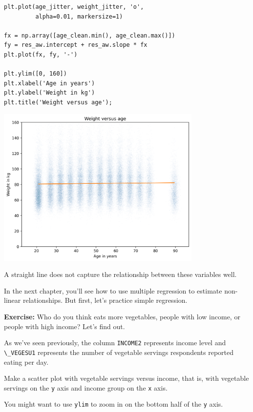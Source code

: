 \begin{lstlisting}[]
plt.plot(age_jitter, weight_jitter, 'o', 
         alpha=0.01, markersize=1)

fx = np.array([age_clean.min(), age_clean.max()])
fy = res_aw.intercept + res_aw.slope * fx
plt.plot(fx, fy, '-')

plt.ylim([0, 160])
plt.xlabel('Age in years')
plt.ylabel('Weight in kg')
plt.title('Weight versus age');
\end{lstlisting}

\begin{center}
\includegraphics[width=4in]{chapters/09_relationships_files/09_relationships_106_0.png}
\end{center}

A straight line does not capture the relationship between these
variables well.

In the next chapter, you'll see how to use multiple regression to
estimate non-linear relationships. But first, let's practice simple
regression.

\textbf{Exercise:} Who do you think eats more vegetables, people with
low income, or people with high income? Let's find out.

As we've seen previously, the column \passthrough{\lstinline!INCOME2!}
represents income level and \passthrough{\lstinline!\_VEGESU1!}
represents the number of vegetable servings respondents reported eating
per day.

Make a scatter plot with vegetable servings versus income, that is, with
vegetable servings on the \passthrough{\lstinline!y!} axis and income
group on the \passthrough{\lstinline!x!} axis.

You might want to use \passthrough{\lstinline!ylim!} to zoom in on the
bottom half of the \passthrough{\lstinline!y!} axis.

